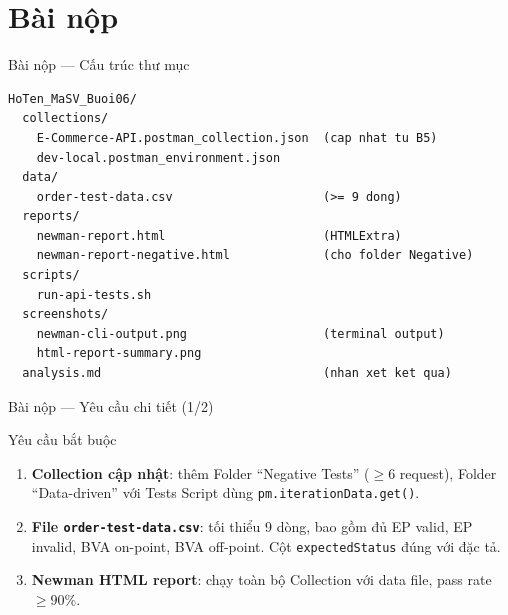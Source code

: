 \documentclass[aspectratio=169,10pt]{beamer}
\begin{document}
\section{Bài nộp}

\begin{frame}[fragile]{Bài nộp --- Cấu trúc thư mục}
\begin{lstlisting}[style=bash]
HoTen_MaSV_Buoi06/
  collections/
    E-Commerce-API.postman_collection.json  (cap nhat tu B5)
    dev-local.postman_environment.json
  data/
    order-test-data.csv                     (>= 9 dong)
  reports/
    newman-report.html                      (HTMLExtra)
    newman-report-negative.html             (cho folder Negative)
  scripts/
    run-api-tests.sh
  screenshots/
    newman-cli-output.png                   (terminal output)
    html-report-summary.png
  analysis.md                               (nhan xet ket qua)
\end{lstlisting}
\end{frame}

\begin{frame}{Bài nộp --- Yêu cầu chi tiết (1/2)}
  \begin{block}{Yêu cầu bắt buộc}
    \begin{enumerate}
      \item \textbf{Collection cập nhật}: thêm Folder ``Negative Tests''
        ($\geq 6$ request), Folder ``Data-driven'' với Tests Script
        dùng \texttt{pm.iterationData.get()}.

      \item \textbf{File \texttt{order-test-data.csv}}: tối thiểu 9 dòng,
        bao gồm đủ EP valid, EP invalid, BVA on-point, BVA off-point.
        Cột \texttt{expectedStatus} đúng với đặc tả.

      \item \textbf{Newman HTML report}: chạy toàn bộ Collection với
        data file, pass rate $\geq 90\%$.
    \end{enumerate}
  \end{block}
\end{frame}
\end{document}
